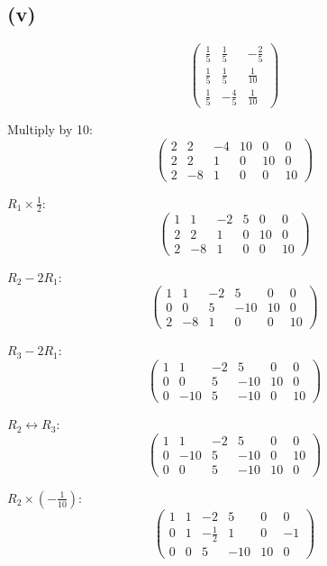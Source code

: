 \subsection*{(v)}
\[
	\begin{pmatrix}
		\frac{1}{5} & \frac{1}{5}  & -\frac{2}{5} \\
		\frac{1}{5} & \frac{1}{5}  & \frac{1}{10} \\
		\frac{1}{5} & -\frac{4}{5} & \frac{1}{10}
	\end{pmatrix}
\]

Multiply by 10:
\[
	\left(\begin{array}{ccc|ccc}
			2 & 2  & -4 & 10 & 0  & 0  \\
			2 & 2  & 1  & 0  & 10 & 0  \\
			2 & -8 & 1  & 0  & 0  & 10
		\end{array}\right)
\]

$R_1 \times \frac{1}{2}$:
\[
	\left(\begin{array}{ccc|ccc}
			1 & 1  & -2 & 5 & 0  & 0  \\
			2 & 2  & 1  & 0 & 10 & 0  \\
			2 & -8 & 1  & 0 & 0  & 10
		\end{array}\right)
\]

$R_2 - 2R_1$:
\[
	\left(\begin{array}{ccc|ccc}
			1 & 1   & -2 & 5   & 0  & 0  \\
			0 & 0   & 5  & -10 & 10 & 0  \\
			2 & -8 & 1  & 0 & 0  & 10
		\end{array}\right)
\]

$R_3 - 2R_1$:
\[
	\left(\begin{array}{ccc|ccc}
			1 & 1   & -2 & 5   & 0  & 0  \\
			0 & 0   & 5  & -10 & 10 & 0  \\
			0 & -10 & 5  & -10 & 0  & 10
		\end{array}\right)
\]

$R_2 \leftrightarrow R_3$:
\[
	\left(\begin{array}{ccc|ccc}
			1 & 1   & -2 & 5   & 0  & 0  \\
			0 & -10 & 5  & -10 & 0  & 10 \\
			0 & 0   & 5  & -10 & 10 & 0
		\end{array}\right)
\]

$R_2 \times (-\frac{1}{10})$:
\[
	\left(\begin{array}{ccc|ccc}
			1 & 1 & -2           & 5   & 0  & 0  \\
			0 & 1 & -\frac{1}{2} & 1   & 0  & -1 \\
			0 & 0 & 5            & -10 & 10 & 0
		\end{array}\right)
\]

